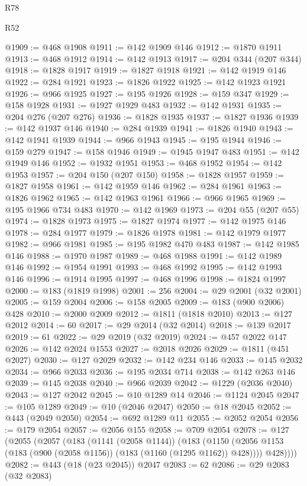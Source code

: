 \begin{lexlean}{R78}
\begin{lexlean}{R52}
\begin{coremodule}
{{{{{{{{{{{{{{{{{{{{{{{{{{{{{{{{{{{{{{{{{{{{{{{{{{{{{{{{{{{{{{{{{{{{{{{{{{{{{{{{{{{{{{{{{{{{{{{{{{{{{{{{{{{{{{{{{{{{{{{{{{{{{{{{{{{{{{{{{{{{{{{{{{{{{{{{{{{{{{{{{{{{{{{{{{{{{{{{{{{{{{{{{{{{{{{{{{{{{{@1909 := @468 @1908
@1911 := @142 @1909 @146
@1912 := @1870 @1911
@1913 := @468 @1912
@1914 := @142 @1913
@1917 := @204 @344 (@207 @344)
@1918 := @1828 @1917
@1919 := @1827 @1918
@1921 := @142 @1919 @146
@1922 := @284 @1921
@1923 := @1826 @1922
@1925 := @142 @1923 @1921
@1926 := @966 @1925
@1927 := @195 @1926
@1928 := @159 @347
@1929 := @158 @1928
@1931 := @1927 @1929 @483
@1932 := @142 @1931
@1935 := @204 @276 (@207 @276)
@1936 := @1828 @1935
@1937 := @1827 @1936
@1939 := @142 @1937 @146
@1940 := @284 @1939
@1941 := @1826 @1940
@1943 := @142 @1941 @1939
@1944 := @966 @1943
@1945 := @195 @1944
@1946 := @159 @279
@1947 := @158 @1946
@1949 := @1945 @1947 @483
@1951 := @142 @1949 @146
@1952 := @1932 @1951
@1953 := @468 @1952
@1954 := @142 @1953
@1957 := @204 @150 (@207 @150)
@1958 := @1828 @1957
@1959 := @1827 @1958
@1961 := @142 @1959 @146
@1962 := @284 @1961
@1963 := @1826 @1962
@1965 := @142 @1963 @1961
@1966 := @966 @1965
@1969 := @195 @1966 @734 @483
@1970 := @142 @1969
@1973 := @204 @55 (@207 @55)
@1974 := @1828 @1973
@1975 := @1827 @1974
@1977 := @142 @1975 @146
@1978 := @284 @1977
@1979 := @1826 @1978
@1981 := @142 @1979 @1977
@1982 := @966 @1981
@1985 := @195 @1982 @470 @483
@1987 := @142 @1985 @146
@1988 := @1970 @1987
@1989 := @468 @1988
@1991 := @142 @1989 @146
@1992 := @1954 @1991
@1993 := @468 @1992
@1995 := @142 @1993 @146
@1996 := @1914 @1995
@1997 := @468 @1996
@1998 := @1824 @1997
@2000 := @183 (@1819 @1998)
@2001 := 256
@2004 := @29 @2001 (@32 @2001)
@2005 := @159 @2004
@2006 := @158 @2005
@2009 := @183 (@900 @2006) @428
@2010 := @2000 @2009
@2012 := @1811 (@1818 @2010)
@2013 := @127 @2012
@2014 := 60
@2017 := @29 @2014 (@32 @2014)
@2018 := @139 @2017
@2019 := 61
@2022 := @29 @2019 (@32 @2019)
@2024 := @457 @2022 @147
@2026 := @142 @2024 @1553
@2027 := @2018 @2026
@2029 := @1811 (@451 @2027)
@2030 := @127 @2029
@2032 := @142 @234 @146
@2033 := @145 @2032
@2034 := @966 @2033
@2036 := @195 @2034 @714
@2038 := @142 @263 @146
@2039 := @145 @2038
@2040 := @966 @2039
@2042 := @1229 (@2036 @2040)
@2043 := @127 @2042
@2045 := @10 @1289 @14
@2046 := @1124 @2045
@2047 := @105 @1289
@2049 := @10 (@2046 @2047)
@2050 := @18 @2045
@2052 := @443 (@2049 @2050)
@2054 := @692 @1289 @11
@2055 := @2052 @2054
@2056 := @179 @2054
@2057 := @2056 @155
@2058 := @709 @2054
@2078 := @127
    (@2055
      (@2057
        (@183
          (@1141 (@2058 @1144))
          (@183
            (@1150 (@2056 @1153 (@183 (@900 (@2058 @1156)) (@183 (@1160 (@1295 @1162)) @428))))
            @428))))
@2082 := @443 (@18 (@23 @2045)) @2047
@2083 := 62
@2086 := @29 @2083 (@32 @2083)
}}}}}}}}}}}}}}}}}}}}}}}}}}}}}}}}}}}}}}}}}}}}}}}}}}}}}}}}}}}}}}}}}}}}}}}}}}}}}}}}}}}}}}}}}}}}}}}}}}}}}}}}}}}}}}}}}}}}}}}}}}}}}}}}}}}}}}}}}}}}}}}}}}}}}}}}}}}}}}}}}}}}}}}}}}}}}}}}}}}}}}}}}}}}}}}}}}}}}}
\end{coremodule}
\end{lexlean}
\end{lexlean}
